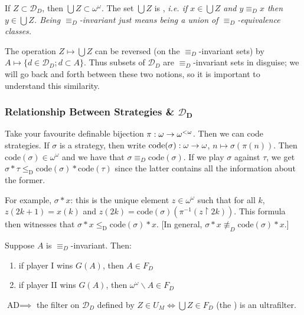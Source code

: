 \documentclass[]{article}
\newcommand{\om}{\omega}
\newcommand{\lom}{{<\omega}}
\newcommand{\ad}{\textrm{AD}}
\newcommand{\led}{\le_{\mathrm{D}}}
\newcommand{\D}{\mathcal{D}}
\newcommand{\cd}{\textrm{code}}
\begin{document}

If $Z\subset \D_D$, then $\bigcup Z \subset \om^\om$. The set $\bigcup Z$ is , \it{i.e.} if $x \in \bigcup Z$ and $y \equiv_D x$ then $y \in \bigcup Z$. Being $\equiv_D$-invariant just means being a union of $\equiv_D$-equivalence classes.

The operation $Z \mapsto \bigcup Z$ can be reversed (on the $\equiv_D$-invariant sets) by $A\mapsto \{d\in \D_D;d\subset A\}$. Thus subsets of $\D_D$ are $\equiv_D$-invariant sets in disguise; we will go back and forth between these two notions, so it is important to understand this similarity.

\subsubsection*{Relationship Between Strategies \& $ \bm{\D_D}$}

Take your favourite definable bijection $\pi : \om\ra \om^\lom$. Then we can code strategies. If $\sigma$ is a strategy, then write $\cd(\sigma) : \om \ra \om$, $n\mapsto \sigma(\pi(n))$. Then $\cd(\sigma)\in\om^\om$ and we have that $\sigma \equiv_D \cd(\sigma)$. If we play $\sigma$ against $\tau$, we get $\sigma \ast \tau \led \cd(\sigma)\ast\cd(\tau)$ since the latter contains all the information about the former.

For example, $\sigma \ast x$: this is the unique element $z\in \om^\om$ such that for all $k$, $z(2k+1) = x(k)$ and $z(2k) = \cd(\sigma)(\pi^{-1}(z\restriction 2k))$. This formula then witnesses that $\sigma \ast x \led \cd(\sigma) \ast x$. [In general, $\sigma \ast x \not\equiv_D \cd(\sigma)\ast x$.]

\begin{thmenv*}
    Suppose $A$ is $\equiv_D$-invariant. Then:
    \begin{enumerate}[label = (\roman*)]
        \item if player I wins $G(A)$, then $A \in F_D$
        \item if player II wins $G(A)$, then $\om^\om \backslash A \in F_D$
    \end{enumerate}
\end{thmenv*}

\begin{thmenv*}[Corollary]
    $\ad\implies$ the filter on $\D_D$ defined by $Z \in U_M \iff \bigcup Z \in F_D$ (the ) is an ultrafilter.
\end{thmenv*}
\end{document}

